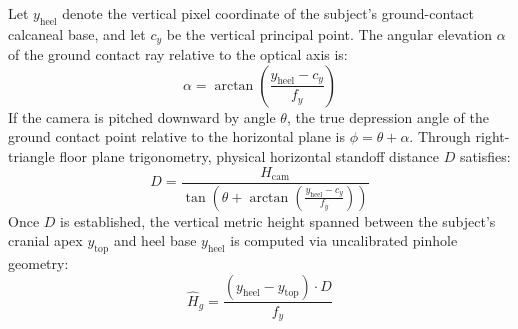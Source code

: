 \documentclass[12pt,a4paper,oneside]{report}
\begin{document}
Let $y_{\text{heel}}$ denote the vertical pixel coordinate of the subject's ground-contact calcaneal base, and let $c_y$ be the vertical principal point. The angular elevation $\alpha$ of the ground contact ray relative to the optical axis is:
\begin{equation}
\alpha = \arctan\left(\frac{y_{\text{heel}} - c_y}{f_y}\right)
\end{equation}
If the camera is pitched downward by angle $\theta$, the true depression angle of the ground contact point relative to the horizontal plane is $\phi = \theta + \alpha$. Through right-triangle floor plane trigonometry, physical horizontal standoff distance $D$ satisfies:
\begin{equation}
D = \frac{H_{\text{cam}}}{\tan\left(\theta + \arctan\left(\frac{y_{\text{heel}} - c_y}{f_y}\right)\right)}
\end{equation}
Once $D$ is established, the vertical metric height spanned between the subject's cranial apex $y_{\text{top}}$ and heel base $y_{\text{heel}}$ is computed via uncalibrated pinhole geometry:
\begin{equation}
\widehat{H}_g = \frac{(y_{\text{heel}} - y_{\text{top}}) \cdot D}{f_y}
\end{equation}
\end{document}
